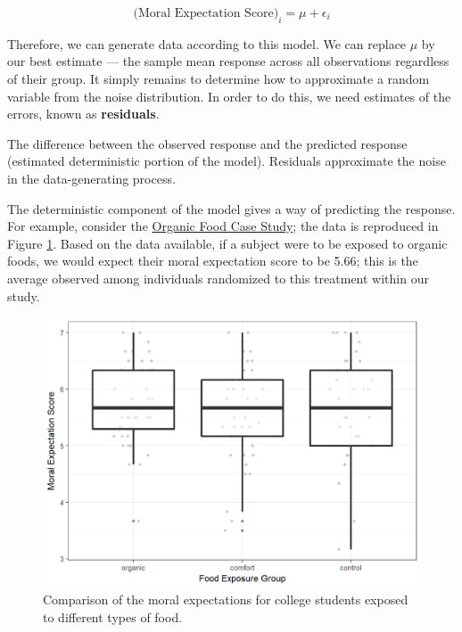 \documentclass[]{book}
\theoremstyle{definition}
\theoremstyle{definition}
\theoremstyle{definition}
\theoremstyle{remark}
\let\BeginKnitrBlock\begin \let\EndKnitrBlock\end
\begin{document}
\begin{equation}
  \text{(Moral Expectation Score)}_i = \mu + \epsilon_i
  \label{eq:null-model}
\end{equation}

Therefore, we can generate data according to this model. We can replace
\(\mu\) by our best estimate --- the sample mean response across all
observations regardless of their group. It simply remains to determine
how to approximate a random variable from the noise distribution. In
order to do this, we need estimates of the errors, known as
\textbf{residuals}.

\BeginKnitrBlock{definition}[Residual]
\protect\hypertarget{def:defn-residual}{}{\label{def:defn-residual}
{} }The difference between the observed response
and the predicted response (estimated deterministic portion of the
model). Residuals approximate the noise in the data-generating process.
\EndKnitrBlock{definition}

The deterministic component of the model gives a way of predicting the
response. For example, consider the
\protect\hyperlink{CaseOrganic}{Organic Food Case Study}; the data is
reproduced in Figure \ref{fig:anovamodel-organic-boxplot}. Based on the
data available, if a subject were to be exposed to organic foods, we
would expect their moral expectation score to be 5.66; this is the
average observed among individuals randomized to this treatment within
our study.

\begin{figure}

{\centering \includegraphics[width=0.8\linewidth]{./Images/anovamodel-organic-boxplot-1} 

}

\caption{Comparison of the moral expectations for college students exposed to different types of food.}\label{fig:anovamodel-organic-boxplot}
\end{figure}
\end{document}
